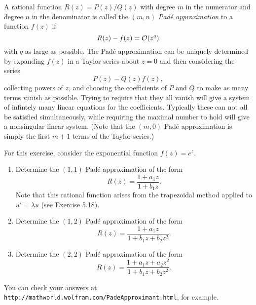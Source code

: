 

A rational function $R(z) = P(z)/Q(z)$ with 
degree $m$ in the numerator and degree $n$
in the denominator is called the $(m,n)$ {\em Pad\'e approximation}
to a function $f(z)$ if
\[
R(z) - f(z) = {\mathcal O}(z^q)
\]
with $q$ as large as possible.  The Pad\'e approximation can be uniquely
determined by expanding $f(z)$ in a Taylor series about $z=0$ and then
considering the series
\[
P(z) - Q(z)f(z),
\]
collecting powers of $z$, and choosing the coefficients of $P$ and $Q$ to
make as many terms vanish as possible.  Trying to require that they all
vanish will give a system of infintely many linear equations for the
coefficients.  Typically these can not all be satisfied simultaneously, 
while requiring the maximal number to hold will give a nonsingular linear
system.  (Note that the $(m,0)$ Pad\'e approximation is simply the first
$m+1$ terms of the Taylor series.)

\vskip 5pt
For this exercise, consider the exponential function $f(z) = e^z$. 
\begin{enumerate}
\item Determine the $(1,1)$ Pad\'e approximation of the form 
\[
R(z) = \frac{1 + a_1 z}{1 + b_1 z}.
\]
Note that this rational function arises from the trapezoidal method applied
to $u' = \lambda u$ (see Exercise 5.18).
\item Determine the $(1,2)$ Pad\'e approximation of the form 
\[
R(z) = \frac{1 + a_1 z}{1 + b_1 z + b_2 z^2}.
\]
\item Determine the $(2,2)$ Pad\'e approximation of the form
\[
R(z) = \frac{1 + a_1 z + a_2 z^2}{1 + b_1 z + b_2 z^2}.
\]
\end{enumerate}
You can check your answers at {\tt
http://mathworld.wolfram.com/PadeApproximant.html}, for example.


